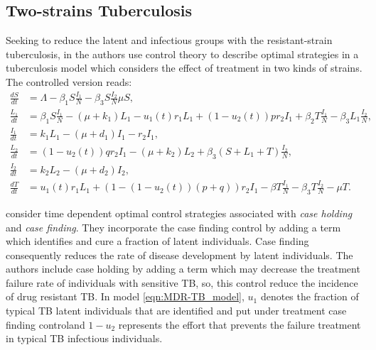 \subsection*{Two-strains Tuberculosis}
Seeking to reduce the latent and infectious groups with the 
resistant-strain tuberculosis, in \cite{Lenhart2002} the authors  use 
control theory to describe optimal strategies in a tuberculosis model 
which considers the effect of treatment in two kinds of strains. The 
controlled version reads:
	\begin{equation}\label{eqn:MDR-TB_model}
	  \begin{aligned}
	    \frac{dS}{dt} &=
		    \Lambda - \beta_1 S \frac{I_1}{N} 
		    - \beta_3 S \frac{I_2}{N}
		    \mu S,
		  \\
		  \frac{L_1}{dt} &=
			  \beta_1 S \frac{I_1}{N}
			  - (\mu + k_1) L_1
			  - u_1 (t) r_1 L_1
			  + (1 - u_2 (t)) p r_2 I_1
				+ \beta_2 T \frac{I_1}{N}
				- \beta_3 L_1 \frac{I_2}{N},
			\\
			\frac{I_1}{dt} &= 
				k_1 L_1
				- (\mu + d_1) I_1
				-r_2 I_1,
			\\
			\frac{L_2}{dt} &=
				(1 - u_2(t)) q r_2 I_1
				- (\mu + k_2) L_2
				+ \beta_3 (S + L_1 + T) \frac{I_2}{N},
			\\
			\frac{I_2}{dt} &=
				k_2 L_2 - (\mu + d_2) I_2,
			\\
			\frac{d T}{dt} &=
				u_1(t) r_1 L_1
				+ (1 - (1 - u_2(t))(p + q)) r_2 I_1
				- \beta T \frac{I_1}{N}
				- \beta_3 T \frac{I_2}{N}
				-\mu T.
	  \end{aligned}
	\end{equation}

	\citeauthor*{Lenhart2002} \cite{Lenhart2002} consider time dependent 
optimal control strategies associated with \emph{case holding} and 
\emph{case finding}. They incorporate the case finding control by 
adding a term which identifies and  cure a fraction 
of latent individuals. Case finding consequently reduces the 
rate of disease development by latent individuals. The authors include 
case holding by adding a term which may decrease the 
treatment failure rate of individuals with sensitive  TB, so, this 
control reduce the incidence of drug resistant TB. In model 
\eqref{eqn:MDR-TB_model}, $u_1$ denotes the fraction of typical TB 
latent individuals that are identified  and put under treatment 
\textemdash case finding control\textemdash and 
$1 - u_2$ represents the effort that prevents the failure treatment in 
typical TB infectious individuals.

